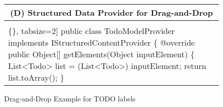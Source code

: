 \begin{figure}[!htb]
\begin{minipage}{0.47\textwidth}
\begin{tabular}{@{}p{}}
 \\ \hline
    \multicolumn{1}{c}{(D) Structured Data Provider for Drag-and-Drop} \\ \hline
  \vspace{-4mm}
\begin{Verbatim}[commandchars=\\\{\}, tabsize=2]
public class TodoModelProvider implements IStructuredContentProvider \{
  @override
    public Object[] getElements(Object inputElement) \{
    List<Todo> list = (List<Todo>) inputElement;
    return list.toArray();
  \}
  \end{Verbatim}
\vspace{-4mm}
 \\ \hline
\end{tabular} 
\caption{Drag-and-Drop Example for TODO labels}
\label{fig:todoList}
\end{minipage}
\end{figure}




%
 